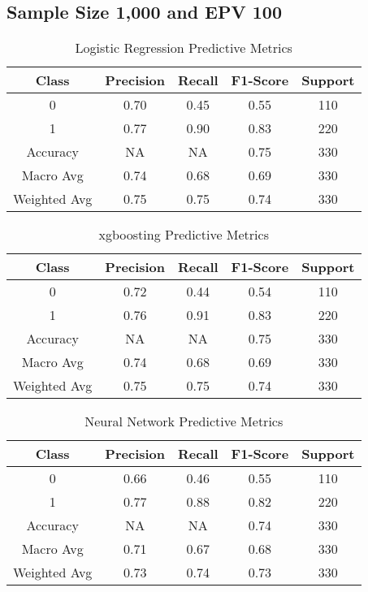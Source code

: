 \documentclass[
  man]{apa7}
\begin{document}
\hypertarget{sample-size-1000-and-epv-100}{%
\subsection{Sample Size 1,000 and EPV 100}\label{sample-size-1000-and-epv-100}}

\begin{table}
\centering
\caption{\label{tab:logitable1k}Logistic Regression Predictive Metrics}
\centering
\fontsize{12}{14}\selectfont
\begin{tabular}[t]{c|c|c|c|c}
\hline
Class & Precision & Recall & F1-Score & Support\\
\hline
0 & 0.70 & 0.45 & 0.55 & 110\\
\hline
1 & 0.77 & 0.90 & 0.83 & 220\\
\hline
Accuracy & NA & NA & 0.75 & 330\\
\hline
Macro Avg & 0.74 & 0.68 & 0.69 & 330\\
\hline
Weighted Avg & 0.75 & 0.75 & 0.74 & 330\\
\hline
\end{tabular}
\end{table}

\begin{table}
\centering
\caption{\label{tab:xgbtable1k}xgboosting Predictive Metrics}
\centering
\fontsize{12}{14}\selectfont
\begin{tabular}[t]{c|c|c|c|c}
\hline
Class & Precision & Recall & F1-Score & Support\\
\hline
0 & 0.72 & 0.44 & 0.54 & 110\\
\hline
1 & 0.76 & 0.91 & 0.83 & 220\\
\hline
Accuracy & NA & NA & 0.75 & 330\\
\hline
Macro Avg & 0.74 & 0.68 & 0.69 & 330\\
\hline
Weighted Avg & 0.75 & 0.75 & 0.74 & 330\\
\hline
\end{tabular}
\end{table}

\begin{table}
\centering
\caption{\label{tab:nn1k}Neural Network Predictive Metrics}
\centering
\fontsize{12}{14}\selectfont
\begin{tabular}[t]{c|c|c|c|c}
\hline
Class & Precision & Recall & F1-Score & Support\\
\hline
0 & 0.66 & 0.46 & 0.55 & 110\\
\hline
1 & 0.77 & 0.88 & 0.82 & 220\\
\hline
Accuracy & NA & NA & 0.74 & 330\\
\hline
Macro Avg & 0.71 & 0.67 & 0.68 & 330\\
\hline
Weighted Avg & 0.73 & 0.74 & 0.73 & 330\\
\hline
\end{tabular}
\end{table}
\end{document}
